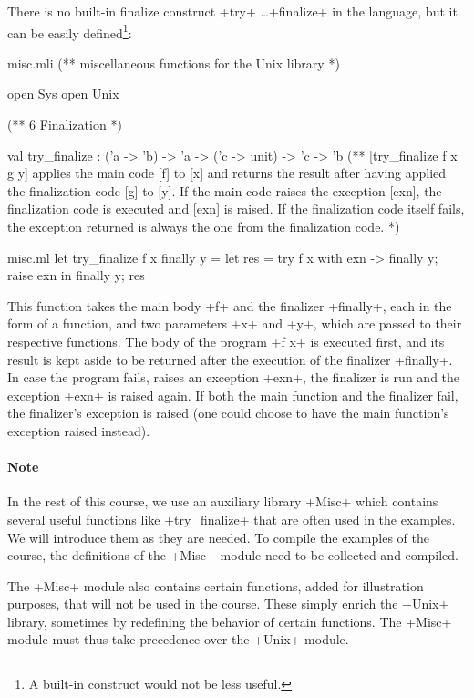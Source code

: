 There is no built-in finalize construct \ml+try+ \ldots \ml+finalize+ in
the {\ocaml} language, but it can be easily defined\footnote{A
  built-in construct would not be less useful.}:
\begin{codefile}{misc.mli}
(** miscellaneous functions for the Unix library *)

open Sys
open Unix

(** {6 Finalization} *)

val try_finalize : ('a -> 'b) -> 'a -> ('c -> unit) -> 'c -> 'b
(** [try_finalize f x g y] applies the main code [f] to [x] and
   returns the result after having applied the finalization 
   code [g] to [y]. If the main code raises the exception
   [exn], the finalization code is executed and [exn] is raised.
   If the finalization code itself fails, the exception
   returned is always the one from the finalization code. *)
\end{codefile}
%
\begin{listingcodefile}{misc.ml}
let try_finalize f x finally y =
  let res = try f x with exn -> finally y; raise exn in 
  finally y; 
  res
\end{listingcodefile}
%
This function takes the main body \ml+f+ and the finalizer
\ml+finally+, each in the form of a function, and two parameters \ml+x+
and \ml+y+, which are passed to their respective functions. The body
of the program \ml+f x+ is executed first, and its result is kept
aside to be returned after the execution of the finalizer 
\ml+finally+. In case the program fails, \ie{} raises an exception \ml+exn+,
the finalizer is run and the exception \ml+exn+ is raised
again. If both the main function and the finalizer fail, the
finalizer's exception is raised (one could choose to have the main
function's exception raised instead).

\paragraph{Note}

In the rest of this course, we use an auxiliary library \ml+Misc+
which contains several useful functions like \ml+try_finalize+ that are often
used in the examples. We will introduce them as they are needed. To
compile the examples of the course, the definitions of the \ml+Misc+
module need to be collected and compiled.

The \ml+Misc+ module also contains certain functions, added for
illustration purposes, that will not be used in the course. These
simply enrich the \ml+Unix+ library, sometimes by redefining the
behavior of certain functions.  The \ml+Misc+ module must thus take
precedence over the \ml+Unix+ module.

